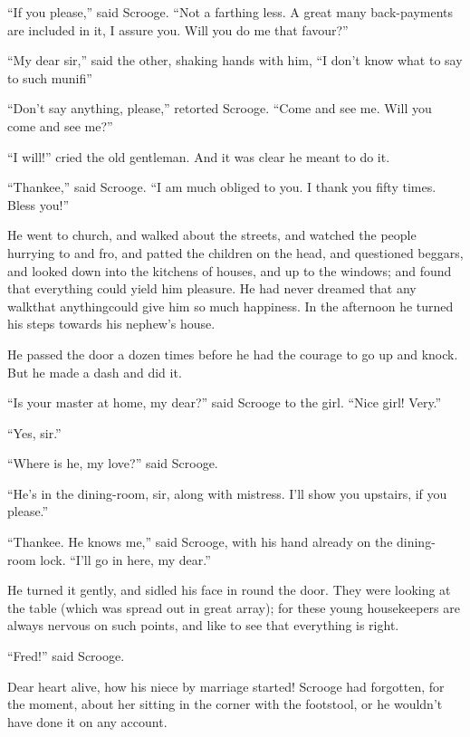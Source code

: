 \documentclass[paper=5.5in:8.5in,BCOR=10mm,twoside,DIV=15,12pt,usegeometry,openany]{scrbook} %
\begin{document}
\enquote{If you please,} said Scrooge. \enquote{Not a farthing less. A great many back-payments are included in it, I assure you. Will you do me that favour?}

\enquote{My dear sir,} said the other, shaking hands with him, \enquote{I don't know what to say to such munifi\textemdash \textemdash }

\enquote{Don't say anything, please,} retorted Scrooge. \enquote{Come and see me. Will you come and see me?}

\enquote{I will!} cried the old gentleman. And it was clear he meant to do it.

\enquote{Thankee,} said Scrooge. \enquote{I am much obliged to you. I thank you fifty times. Bless you!}

He went to church, and walked about the streets, and watched the people hurrying to and fro, and patted the children on the head, and questioned beggars, and looked down into the kitchens of houses, and up to the windows; and found that everything could yield him pleasure. He had never dreamed that any walk\textemdash that anything\textemdash could give him so much happiness. In the afternoon he turned his steps towards his nephew's house.

He passed the door a dozen times before he had the courage to go up and knock. But he made a dash and did it.

\enquote{Is your master at home, my dear?} said Scrooge to the girl. \enquote{Nice girl! Very.}

\enquote{Yes, sir.}

\enquote{Where is he, my love?} said Scrooge.

\enquote{He's in the dining-room, sir, along with mistress. I'll show you upstairs, if you please.}

\enquote{Thankee. He knows me,} said Scrooge, with his hand already on the dining-room lock. \enquote{I'll go in here, my dear.}

He turned it gently, and sidled his face in round the door. They were looking at the table (which was spread out in great array); for these young housekeepers are always nervous on such points, and like to see that everything is right.

\enquote{Fred!} said Scrooge.

Dear heart alive, how his niece by marriage started! Scrooge had forgotten, for the moment, about her sitting in the corner with the footstool, or he wouldn't have done it on any account.
\end{document}
